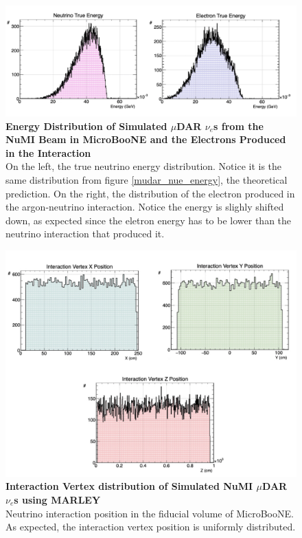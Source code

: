 \begin{figure}[h!]
    \centering
    \includegraphics[width=160mm]{Figures/NuMI_muDAR_Neutrino_Electron_Energy.jpeg}
    \caption[Energy Distribution of Simulated $\mu$DAR $\nu_e$s from the NuMI Beam in MicroBooNE and the Electrons Produced in the Interaction]{{\textbf{Energy Distribution of Simulated $\mu$DAR $\nu_e$s from the NuMI Beam in MicroBooNE and the Electrons Produced in the Interaction}}\\ On the left, the true neutrino energy distribution. Notice it is the same distribution from figure \ref{mudar_nue_energy}, the theoretical prediction. On the right, the distribution of the electron produced in the argon-neutrino interaction. Notice the energy is slighly shifted down, as expected since the eletron energy has to be lower than the neutrino interaction that produced it.}
    \label{sim_energy_dist_figures}
\end{figure}

\begin{figure}[h!]
    \centering
    \includegraphics[width=160mm]{Figures/NuMI_muDAR_vertex.jpeg}
    \caption[Interaction Vertex Distribution of Simulated NuMI $\mu$DAR $\nu_e$s using MARLEY]{{\textbf{Interaction Vertex distribution of Simulated NuMI $\mu$DAR $\nu_e$s using MARLEY}}\\ Neutrino interaction position in the fiducial volume of MicroBooNE. As expected, the interaction vertex position is uniformly distributed.}
    \label{sim_vertex_dist_figures}
\end{figure}

